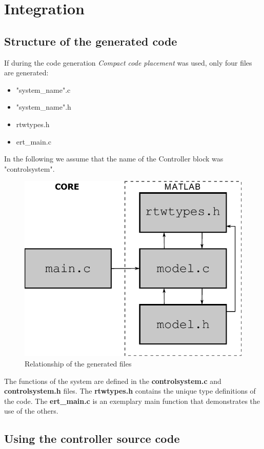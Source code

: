 \section{Integration}
\label{sec:integration}

\subsection{Structure of the generated code}

If during the code generation \emph{Compact code placement} was used, only four files are generated:

\begin{itemize}

    \item "system\_name".c
    \item "system\_name".h
    \item rtwtypes.h
    \item ert\_main.c

\end{itemize}

In the following we assume that the name of the Controller block was "controlsystem".

\begin{figure}[!ht]
    \centering
    \includegraphics[width=0.6\linewidth]{img/rtw}
    \caption{Relationship of the generated files}
    \label{fig:rtw}
\end{figure}

The functions of the system are defined in the \textbf{controlsystem.c} and \textbf{controlsystem.h} files. The \textbf{rtwtypes.h} contains the unique type definitions of the code. The \textbf{ert\_main.c} is an exemplary main function that demonstrates the use of the others.

\subsection{Using the controller source code}

